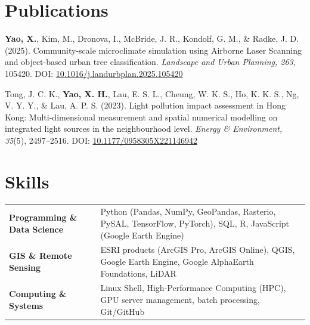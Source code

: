 \documentclass[a4paper,12pt]{article}
\begin{document}
\section{Publications}

\begin{etaremune}[leftmargin=1.5em, itemsep=0.7em, start=3]
    \item \textbf{Yao, X.}, Kim, M., Dronova, I., McBride, J. R., Kondolf, G. M., \& Radke, J. D. (2025). Community-scale microclimate simulation using Airborne Laser Scanning and object-based urban tree classification. \textit{Landscape and Urban Planning, 263}, 105420. DOI: \href{https://doi.org/10.1016/j.landurbplan.2025.105420}{10.1016/j.landurbplan.2025.105420}

    \item Tong, J. C. K., \textbf{Yao, X. H.}, Lau, E. S. L., Cheung, W. K. S., Ho, K. K. S., Ng, V. Y. Y., \& Lau, A. P. S. (2023). Light pollution impact assessment in Hong Kong: Multi-dimensional measurement and spatial numerical modelling on integrated light sources in the neighbourhood level. \textit{Energy \& Environment, 35}(5), 2497--2516. DOI: \href{https://doi.org/10.1177/0958305X221146942}{10.1177/0958305X221146942}

\end{etaremune}


\section{Skills}
\begin{tabularx}{\linewidth}{@{}l X@{}}
\textbf{Programming \& Data Science} & 
Python (Pandas, NumPy, GeoPandas, Rasterio, PySAL, TensorFlow, PyTorch), SQL, R, JavaScript (Google Earth Engine) \\ [3pt]
\textbf{GIS \& Remote Sensing} & 
ESRI products (ArcGIS Pro, ArcGIS Online), QGIS, Google Earth Engine, Google AlphaEarth Foundations, LiDAR \\ [3pt]
\textbf{Computing \& Systems} & 
Linux Shell, High-Performance Computing (HPC), GPU server management, batch processing, Git/GitHub \\
\end{tabularx}

\vfill
{}
\end{document}
